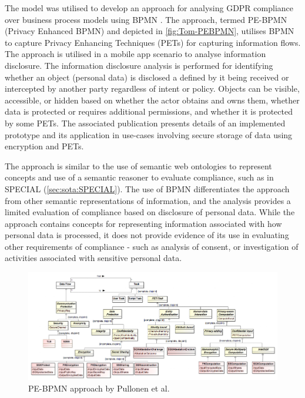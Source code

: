 The model was utilised to develop an approach for analysing GDPR compliance over business process models using BPMN \cite{pullonen_privacy-enhanced_2019}.
The approach, termed PE-BPMN (Privacy Enhanced BPMN) and depicted in \autoref{fig:Tom-PEBPMN}, utilises BPMN to capture Privacy Enhancing Techniques (PETs) for capturing information flows. The approach is utilised in a mobile app scenario to analyse information disclosure.
The information disclosure analysis is performed for identifying whether an object (personal data) is disclosed a defined by it being received or intercepted by another party regardless of intent or policy. Objects can be visible, accessible, or hidden based on whether the actor obtains and owns them, whether data is protected or requires additional permissions, and whether it is protected by some PETs. The associated publication \cite{pullonen_privacy-enhanced_2019} presents details of an implemented prototype and its application in use-cases involving secure storage of data using encryption and PETs. 

The approach is similar to the use of semantic web ontologies to represent concepts and use of a semantic reasoner to evaluate compliance, such as in SPECIAL (\autoref{sec:sota:SPECIAL}). The use of BPMN differentiates the approach from other semantic representations of information, and the analysis provides a limited evaluation of compliance based on disclosure of personal data. While the approach contains concepts for representing information associated with how personal data is processed, it does not provide evidence of its use in evaluating other requirements of compliance - such as analysis of consent, or investigation of activities associated with sensitive personal data.
\begin{figure}[htbp]
    \centering
    \includegraphics[width=\linewidth]{img/Tom_PEBPMN.png}
    \caption{PE-BPMN approach by Pullonen et al. \cite{pullonen_privacy-enhanced_2019}}
    \label{fig:Tom-PEBPMN}
\end{figure}

